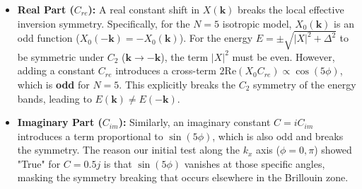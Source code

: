 \documentclass{article}
\begin{document}
\begin{itemize}
    \item \textbf{Real Part ($C_{re}$):} A real constant shift in $X(\mathbf{k})$ breaks the local effective inversion symmetry. Specifically, for the $N=5$ isotropic model, $X_0(\mathbf{k})$ is an odd function ($X_0(-\mathbf{k}) = -X_0(\mathbf{k})$). For the energy $E = \pm\sqrt{|X|^2 + \Delta^2}$ to be symmetric under $C_2$ ($\mathbf{k} \to -\mathbf{k}$), the term $|X|^2$ must be even. However, adding a constant $C_{re}$ introduces a cross-term $2 \text{Re}(X_0 C_{re}) \propto \cos(5\phi)$, which is \textbf{odd} for $N=5$. This explicitly breaks the $C_2$ symmetry of the energy bands, leading to $E(\mathbf{k}) \neq E(-\mathbf{k})$.
    
    \item \textbf{Imaginary Part ($C_{im}$):} Similarly, an imaginary constant $C = i C_{im}$ introduces a term proportional to $\sin(5\phi)$, which is also odd and breaks the symmetry. The reason our initial test along the $k_x$ axis ($\phi=0, \pi$) showed "True" for $C=0.5j$ is that $\sin(5\phi)$ vanishes at those specific angles, masking the symmetry breaking that occurs elsewhere in the Brillouin zone.
    
    
\end{itemize}
\end{document}
